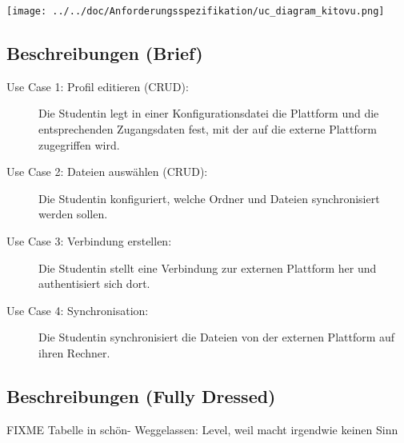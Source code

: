 \documentclass[a4paper]{article}
\begin{document}
\texttt{[image: ../../doc/Anforderungsspezifikation/uc\_diagram\_kitovu.png]}

\subsection{Beschreibungen (Brief)}
\begin{description}
	
\item[Use Case 1: Profil editieren (CRUD):] Die Studentin legt in einer Konfigurationsdatei die Plattform und die entsprechenden Zugangsdaten fest, mit der auf die externe Plattform zugegriffen wird.

\item[Use Case 2: Dateien auswählen (CRUD):] Die Studentin konfiguriert, welche Ordner und Dateien synchronisiert werden sollen.

\item[Use Case 3: Verbindung erstellen:] Die Studentin stellt eine Verbindung zur externen Plattform her und authentisiert sich dort.

\item[Use Case 4: Synchronisation:] Die Studentin synchronisiert die Dateien von der externen Plattform auf ihren Rechner.
\end{description}

\pagebreak
\subsection{Beschreibungen (Fully Dressed)}

FIXME Tabelle in schön- Weggelassen: Level, weil macht irgendwie keinen Sinn
\end{document}
